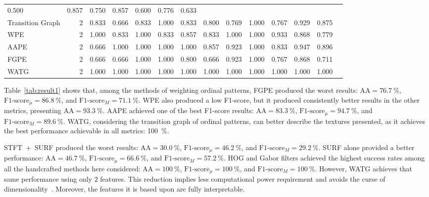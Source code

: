 \documentclass[journal]{IEEEtran}
\begin{document}
\begin{table}
\begin{tabular}{lrrrr*9{r}}
			0.500 & 0.857 & 0.750 & 0.857 &
			0.600 & 0.776 & 0.633\\ 
			Transition Graph & 2 & 
			0.833 & 0.666 & 0.833 & 1.000 &
			0.833 & 0.800 & 0.769 & 1.000 &
			0.767 & 0.929 & 0.875\\
			\cmidrule(lr){1-1}
			\cmidrule(lr){2-2}
			\cmidrule(lr){3-6}
			\cmidrule(lr){7-10}
			\cmidrule(lr){11-11}
			\cmidrule(lr){12-12}
			\cmidrule(lr){13-13}
			WPE & 2 & 
			1.000 & 0.833 & 1.000 & 0.833 &
			0.857 & 0.833 & 1.000 & 1.000 &
			0.933 & 0.868 & 0.779\\ 
			AAPE & 2 & 
			0.666 & 1.000 & 1.000 & 1.000 &
			1.000 & 0.857 & 0.923 & 1.000 &
			0.833 & 0.947 & 0.896\\ 
			FGPE & 2 & 
			0.666 & 0.666 & 1.000 & 1.000 &
			0.800 & 0.666 & 0.923 & 1.000 &
			0.767 & 0.868 & 0.711\\ 
			\cmidrule(lr){1-1}
			\cmidrule(lr){2-2}
			\cmidrule(lr){3-6}
			\cmidrule(lr){7-10}
			\cmidrule(lr){11-11}
			\cmidrule(lr){12-12}
			\cmidrule(lr){13-13}
			WATG & 2 & 
			1.000 & 1.000 & 1.000 & 1.000 &
			1.000 & 1.000 & 1.000 & 1.000 &
			1.000 & 1.000 & 1.000\\
			\bottomrule
		\end{tabular}
	\end{table}
	
	Table~\ref{tab:result1} shows that, among the methods of weighting ordinal patterns, FGPE produced the worst results: $\text{AA} = \SI{76.7}{\percent}$, $\text{F1-score}_\mu = \SI{86.8}{\percent}$, and $\text{F1-score}_M = \SI{71.1}{\percent}$.
	WPE also produced a low F1-score, but it produced consistently better results in the other metrics, presenting $\text{AA} = \SI{93.3}{\percent}$.
	AAPE achieved one of the best F1-score results: $\text{AA} = \SI{83.3}{\percent}$, $\text{F1-score}_\mu = \SI{94.7}{\percent}$, and $\text{F1-score}_M = \SI{89.6}{\percent}$.
	WATG, considering the transition graph of ordinal patterns, can better describe the textures presented, as it achieves the best performance achievable in all metrics: \SI{100}{\percent}.
	
	\mbox{STFT + SURF} produced the worst results: $\text{AA} = \SI{30.0}{\percent}$, $\text{F1-score}_\mu = \SI{46.2}{\percent}$, and $\text{F1-score}_M = \SI{29.2}{\percent}$.
	SURF alone provided a better performance: $\text{AA} = \SI{46.7}{\percent}$,  $\text{F1-score}_\mu = \SI{66.6}{\percent}$, and $\text{F1-score}_M = \SI{57.2}{\percent}$.
	HOG and Gabor filters achieved the highest success rates
	among all the handcrafted methods here considered: $\text{AA} = \SI{100}{\percent}$, $\text{F1-score}_\mu = \SI{100}{\percent}$, and $\text{F1-score}_M = \SI{100}{\percent}$.
	However, WATG achieves that same performance using only $2$ features.
	This reduction implies less computational power requirement and avoids the curse of dimensionality~\cite{TheCursesofDimensionality2018}.
	Moreover, the features it is based upon are fully interpretable.
	
\end{document}
